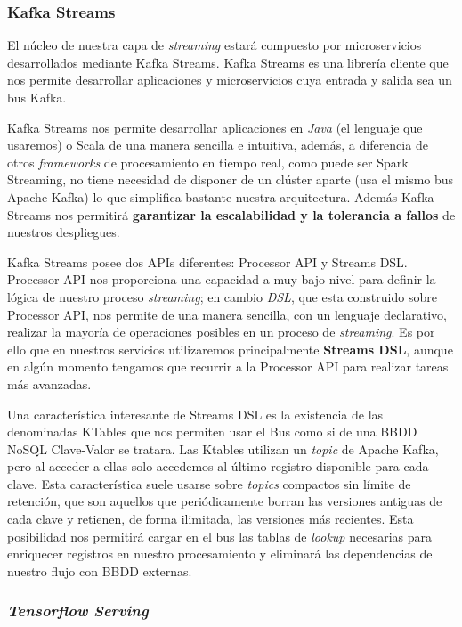 \subsubsection{Kafka Streams}

El núcleo de nuestra capa de \textit{streaming} estará compuesto por microservicios desarrollados mediante 
 Kafka Streams. Kafka Streams \cite{kstreams} es una librería cliente que nos permite desarrollar aplicaciones y microservicios  cuya entrada y salida sea un bus Kafka. 
 
 Kafka Streams nos permite desarrollar aplicaciones en \textit{Java} (el lenguaje que usaremos) o Scala de una manera sencilla e intuitiva, además, a diferencia de otros \textit{frameworks} de procesamiento en tiempo real, como puede ser Spark Streaming, no tiene necesidad de disponer de un clúster aparte (usa el mismo bus Apache Kafka) lo que simplifica bastante nuestra arquitectura. Además Kafka Streams nos permitirá \textbf{garantizar la escalabilidad y la tolerancia a fallos} de nuestros despliegues. 
 
 Kafka Streams posee dos APIs diferentes: Processor API y  Streams DSL.  Processor API nos proporciona una capacidad a muy bajo nivel para definir la lógica de nuestro proceso \textit{streaming}; en cambio \textit{DSL}, que esta construido sobre  Processor API, nos permite de una manera sencilla, con un lenguaje declarativo, realizar la mayoría de operaciones posibles en un proceso de \textit{streaming}. Es por ello que en nuestros servicios utilizaremos principalmente \textbf{Streams DSL}, aunque en algún momento tengamos que recurrir a la Processor API para realizar tareas más avanzadas.
 
Una característica interesante de Streams DSL es la existencia de las denominadas KTables que nos permiten usar el Bus como si de una BBDD NoSQL Clave-Valor se tratara. Las Ktables utilizan un \textit{topic} de Apache Kafka, pero al acceder a ellas solo accedemos al último registro disponible para cada clave. Esta característica suele usarse sobre \textit{topics} compactos sin límite de retención, que son aquellos que periódicamente  borran las versiones antiguas de cada clave y retienen, de forma ilimitada, las versiones más recientes. Esta posibilidad nos permitirá cargar en el bus las tablas de \textit{lookup} necesarias para enriquecer registros en nuestro procesamiento y eliminará las dependencias de nuestro flujo con BBDD externas. 


 
 
\subsubsection{\textit{Tensorflow Serving}}

